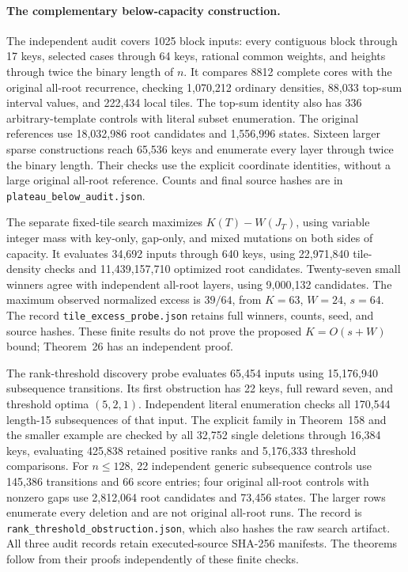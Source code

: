 \documentclass[11pt]{article}
\begin{document}
\paragraph{The complementary below-capacity construction.}\label{app:plateau-below}
The independent audit covers 1025 block inputs: every contiguous block through
17 keys, selected cases through 64 keys, rational common weights, and heights
through twice the binary length of $n$. It compares 8812 complete cores with
the original all-root recurrence, checking 1,070,212 ordinary densities,
88,033 top-sum interval values, and 222,434 local tiles. The top-sum identity
also has 336 arbitrary-template controls with literal subset enumeration.
The original references use 18,032,986 root candidates and 1,556,996 states.
Sixteen larger sparse constructions reach 65,536 keys and enumerate every
layer through twice the binary length. Their checks use the explicit coordinate
identities, without a large original all-root reference. Counts and final
source hashes are in \texttt{plateau\_below\_audit.json}.

The separate fixed-tile search maximizes $K(T)-W(J_T)$, using variable integer
mass with key-only, gap-only, and mixed mutations on both sides of capacity.
It evaluates 34,692 inputs through 640 keys, using 22,971,840 tile-density
checks and 11,439,157,710 optimized root candidates. Twenty-seven small
winners agree with independent all-root layers, using 9,000,132 candidates.
The maximum observed normalized excess is $39/64$, from $K=63$, $W=24$,
$s=64$. The record \texttt{tile\_excess\_probe.json} retains full winners,
counts, seed, and source hashes. These finite results do not prove the proposed
$K=O(s+W)$ bound; Theorem~26 has an independent proof.


The rank-threshold discovery probe evaluates 65,454 inputs using
15,176,940 subsequence transitions. Its first obstruction has 22 keys,
full reward seven, and threshold optima $(5,2,1)$. Independent literal
enumeration checks all 170,544 length-15 subsequences of that input.
The explicit family in Theorem~158 and
the smaller example are checked by all 32,752 single deletions through
16,384 keys, evaluating 425,838 retained positive ranks and 5,176,333
threshold comparisons. For $n\le128$, 22 independent generic subsequence
controls use 145,386 transitions and 66 score entries; four original
all-root controls with nonzero gaps use 2,812,064 root candidates and
73,456 states. The larger rows enumerate every deletion and are not
original all-root runs. The record is
\texttt{rank\_threshold\_obstruction.json}, which also hashes the raw
search artifact. All three audit records retain executed-source
SHA-256 manifests. The theorems follow from their proofs independently
of these finite checks.
\end{document}
